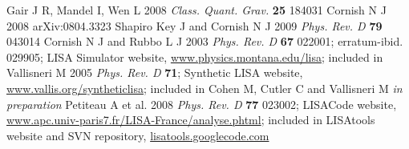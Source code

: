 \documentclass{iopart}
\begin{document}
\begin{thebibliography}{99}
%
 Gair J R, Mandel I, Wen L 2008 \textit{Class. Quant. Grav.} \textbf{25} 184031
%
 Cornish N J 2008 arXiv:0804.3323
%
 Shapiro Key J and Cornish N J 2009 \textit{Phys. Rev. D} \textbf{79} 043014
%
 Cornish N J and Rubbo L J 2003 \textit{Phys. Rev. D} \textbf{67} 022001; erratum-ibid. 029905; LISA Simulator website, \url{www.physics.montana.edu/lisa}; included in \cite{lisatools}
%
 Vallisneri M 2005 \textit{Phys. Rev. D} \textbf{71}; Synthetic LISA website, \url{www.vallis.org/syntheticlisa}; included in \cite{lisatools}
%
 Cohen M, Cutler C and Vallisneri M \textit{in preparation}
%
 Petiteau A et al. 2008 \textit{Phys. Rev. D} \textbf{77} 023002; LISACode website, \url{www.apc.univ-paris7.fr/LISA-France/analyse.phtml}; included in \cite{lisatools}
%
 LISAtools website and SVN repository, \url{lisatools.googlecode.com}

\end{thebibliography}
\end{document}
